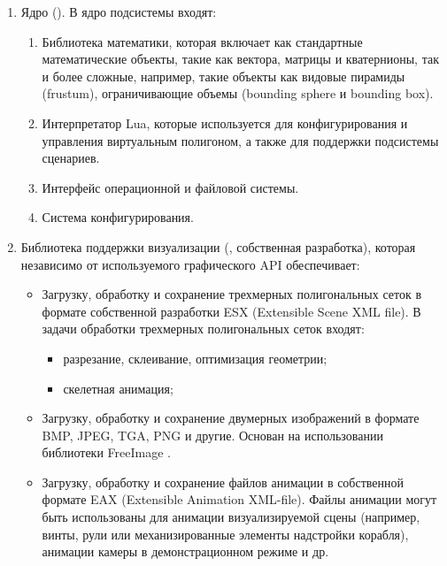 \begin{enumerate}
	\item	Ядро (). В ядро подсистемы входят:
	\begin{enumerate}
		\item	Библиотека математики, которая включает как стандартные математические объекты, 
				такие как вектора, матрицы и кватернионы, так и более сложные, например, 
				такие объекты как видовые пирамиды (frustum), ограничивающие объемы (bounding sphere и bounding box).
		\item	Интерпретатор Lua, которые используется для конфигурирования 
				и управления виртуальным полигоном, 
				а также для поддержки подсистемы сценариев.
		\item 	Интерфейс операционной и файловой системы.
		\item	Система конфигурирования.
	\end{enumerate}
	\item 	Библиотека поддержки визуализации (, собственная разработка), 
			которая независимо от используемого графического API обеспечивает:
			\begin{itemize}
			\item	Загрузку, обработку и сохранение трехмерных полигональных сеток в 
					формате собственной разработки ESX (Extensible Scene XML file). 
					В задачи обработки трехмерных полигональных сеток входят:
					\begin{itemize}
					\item	разрезание, склеивание, оптимизация геометрии;
					\item	скелетная анимация;
					\end{itemize}
			\item	Загрузку, обработку и сохранение двумерных изображений 
					в формате BMP, JPEG, TGA, PNG и другие. 
					Основан на использовании библиотеки FreeImage \citep{freeimage}.
			\item	Загрузку, обработку и сохранение файлов анимации в собственной формате 
					EAX (Extensible Animation XML-file). Файлы анимации могут быть использованы 
					для анимации визуализируемой сцены (например, винты, рули или механизированные 
					элементы надстройки корабля), анимации камеры в 
					демонстрационном режиме и др.
			\end{itemize}

\end{enumerate}
